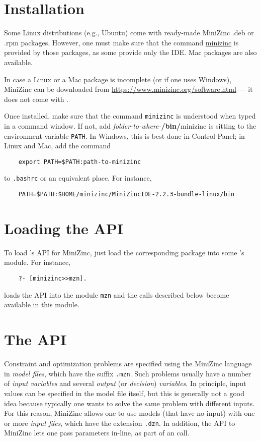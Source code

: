 \section{Installation}

Some Linux distributions (e.g., Ubuntu) come with ready-made MiniZinc .deb
or .rpm packages. However, one must make sure that the command
\url{minizinc} is provided by those packages, as some provide only the IDE.
Mac packages are also available.

In case a Linux or a Mac package is incomplete (or if one uses Windows),
MiniZinc can be downloaded from
\url{https://www.minizinc.org/software.html} --- it does not come with
\FLSYSTEM.

Once installed, make sure that the command \texttt{minizinc} is understood when typed in a
command window. If not, add \emph{folder-to-where-}\textbf{/bin/}minizinc is sitting to the
environment variable \texttt{PATH}.  In Windows, this is best done in
Control Panel; in Linux and Mac, add the command
\begin{verbatim}
    export PATH=$PATH:path-to-minizinc
\end{verbatim}
to \texttt{.bashrc} or an equivalent place. For instance,
\begin{verbatim}
    PATH=$PATH:$HOME/minizinc/MiniZincIDE-2.2.3-bundle-linux/bin
\end{verbatim}

\section{Loading the API}\label{sec-api-mod}

To load \FLSYSTEM's API for MiniZinc, just load the corresponding package
into some \FLSYSTEM's module. For instance,
\begin{verbatim}
    ?- [minizinc>>mzn].
\end{verbatim}
loads the API into the \FLSYSTEM module \texttt{mzn} and the calls
described below become available in this module.

\section{The API}

Constraint and optimization problems are specified using the MiniZinc
language in \emph{model files}, which have the suffix \texttt{.mzn}.
Such problems usually have a number of \emph{input variables}   and several
\emph{output} (or \emph{decision}) \emph{variables}.   
In principle, input values can be specified in the model file itself, but
this is generally not a good idea because typically one wants to solve
the same problem with different inputs.
For this reason, MiniZinc allows one to use models (that have no input)
with one or more \emph{input files}, which have the extension \texttt{.dzn}. 
In addition, the API to MiniZinc lets one pass parameters in-line, as
part of an \FLSYSTEM call.

